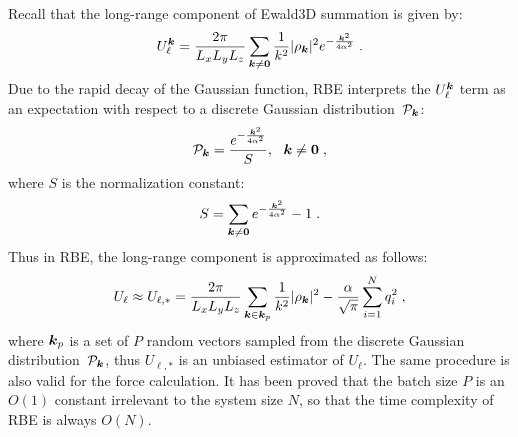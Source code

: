 Recall that the long-range component of Ewald3D summation is given by:
\begin{equation}
	U_{\ell}^{\boldsymbol{k}} = \frac{2 \pi}{L_xL_yL_z} \sum_{\boldsymbol{k} \neq \boldsymbol{0}} \frac{1}{k^2} \lvert\rho_{\boldsymbol{k}}\rvert^2 e^{-\frac{\boldsymbol{k}^2}{4\alpha^2}}\;.
\end{equation}
Due to the rapid decay of the Gaussian function, RBE interprets the $U_{\ell}^{\boldsymbol{k}}$ term as an expectation with respect to a discrete Gaussian distribution~$\mathcal{P}_{\boldsymbol{k}}$:
\begin{equation}
	\mathcal{P}_{\boldsymbol{k}} = \frac{e^{-\frac{\boldsymbol{k}^2}{4\alpha^2}}}{S},~~\boldsymbol{k} \neq \boldsymbol{0} \;,
\end{equation}
where $S$ is the normalization constant:
\begin{equation}
	S = \sum_{\boldsymbol{k} \neq \boldsymbol{0}} e^{-\frac{\boldsymbol{k}^2}{4\alpha^2}} - 1\;.
\end{equation}
Thus in RBE, the long-range component is approximated as follows:
\begin{equation}
	U_{\ell} \approx U_{\ell, *} =  \frac{2 \pi}{L_xL_yL_z} \sum_{\boldsymbol{k} \in \boldsymbol{k}_p} \frac{1}{k^2} \lvert\rho_{\boldsymbol{k}}\rvert^2 - \frac{\alpha}{\sqrt{\pi}}\sum_{i=1}^{N}q_i^2\;,
\end{equation}
where $\boldsymbol{k}_p$ is a set of $P$ random vectors sampled from the discrete Gaussian distribution~$\mathcal{P}_{\boldsymbol{k}}$, thus $U_{\ell, *}$ is an unbiased estimator of $U_{\ell}$.
The same procedure is also valid for the force calculation.
It has been proved that the batch size $P$ is an $O(1)$ constant irrelevant to the system size $N$, so that the time complexity of RBE is always $O(N)$.